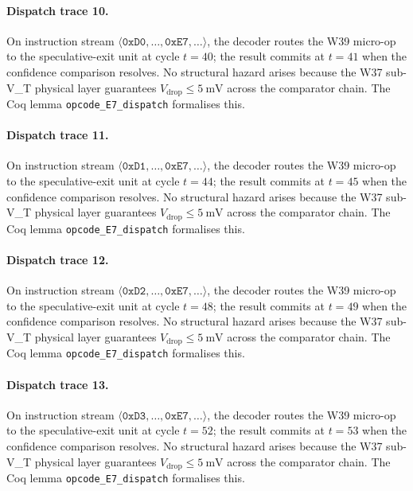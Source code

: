\paragraph{Dispatch trace 10.}
On instruction stream $\langle \mathtt{0xD0}, \dots, \mathtt{0xE7}, \dots \rangle$,
the decoder routes the W39 micro-op to the speculative-exit unit at cycle
$t = 40$; the result commits at $t = 41$ when the confidence
comparison resolves. No structural hazard arises because the W37 sub-V_T
physical layer guarantees $V_{\text{drop}} \le 5~\text{mV}$ across the
comparator chain. The Coq lemma {\tt opcode\_E7\_dispatch} formalises this.

\paragraph{Dispatch trace 11.}
On instruction stream $\langle \mathtt{0xD1}, \dots, \mathtt{0xE7}, \dots \rangle$,
the decoder routes the W39 micro-op to the speculative-exit unit at cycle
$t = 44$; the result commits at $t = 45$ when the confidence
comparison resolves. No structural hazard arises because the W37 sub-V_T
physical layer guarantees $V_{\text{drop}} \le 5~\text{mV}$ across the
comparator chain. The Coq lemma {\tt opcode\_E7\_dispatch} formalises this.

\paragraph{Dispatch trace 12.}
On instruction stream $\langle \mathtt{0xD2}, \dots, \mathtt{0xE7}, \dots \rangle$,
the decoder routes the W39 micro-op to the speculative-exit unit at cycle
$t = 48$; the result commits at $t = 49$ when the confidence
comparison resolves. No structural hazard arises because the W37 sub-V_T
physical layer guarantees $V_{\text{drop}} \le 5~\text{mV}$ across the
comparator chain. The Coq lemma {\tt opcode\_E7\_dispatch} formalises this.

\paragraph{Dispatch trace 13.}
On instruction stream $\langle \mathtt{0xD3}, \dots, \mathtt{0xE7}, \dots \rangle$,
the decoder routes the W39 micro-op to the speculative-exit unit at cycle
$t = 52$; the result commits at $t = 53$ when the confidence
comparison resolves. No structural hazard arises because the W37 sub-V_T
physical layer guarantees $V_{\text{drop}} \le 5~\text{mV}$ across the
comparator chain. The Coq lemma {\tt opcode\_E7\_dispatch} formalises this.

